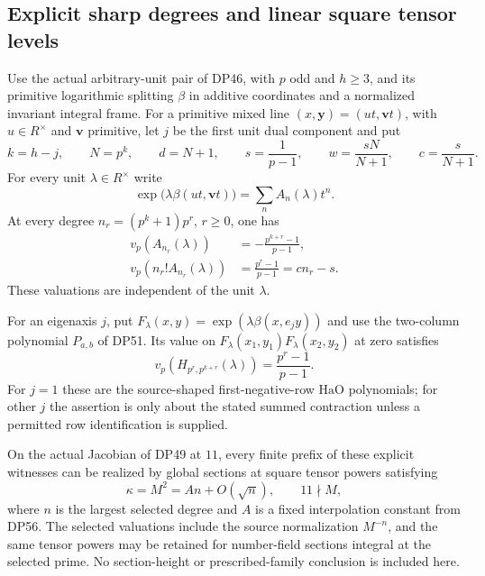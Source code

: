 \subsection{Explicit sharp degrees and linear square tensor levels}

\begin{theorem}\label{DP58}
Use the actual arbitrary-unit pair of DP46, with $p$ odd and $h\ge3$, and its primitive logarithmic splitting $\beta$ in additive coordinates and a normalized invariant integral frame.
For a primitive mixed line $(x,\mathbf y)=(ut,\mathbf vt)$, with $u\in R^\times$ and $\mathbf v$ primitive, let $j$ be the first unit dual component and put
\[
 k=h-j,\qquad N=p^k,\qquad d=N+1,\qquad
 s=\frac1{p-1},\qquad
 w=\frac{sN}{N+1},\qquad c=\frac{s}{N+1}.
\]
For every unit $\lambda\in R^\times$ write
\[
 \exp\bigl(\lambda\beta(ut,\mathbf vt)\bigr)
 =\sum_n A_n(\lambda)t^n.
\]
At every degree $n_r=(p^k+1)p^r$, $r\ge0$, one has
\begin{align}
 v_p(A_{n_r}(\lambda))
 &=-\frac{p^{k+r}-1}{p-1},\label{eq:explicitkernelcoefficient}\\
 v_p(n_r!A_{n_r}(\lambda))
 &=\frac{p^r-1}{p-1}=cn_r-s.\label{eq:explicitkerneljet}
\end{align}
These valuations are independent of the unit $\lambda$.

For an eigenaxis $j$, put
$F_\lambda(x,y)=\exp(\lambda\beta(x,e_jy))$ and use the two-column polynomial $P_{a,b}$ of DP51.
Its value on $F_\lambda(x_1,y_1)F_\lambda(x_2,y_2)$ at zero satisfies
\begin{equation}\label{eq:explicitharmonicjet}
 v_p(H_{p^r,p^{k+r}}(\lambda))
 =\frac{p^r-1}{p-1}.
\end{equation}
For $j=1$ these are the source-shaped first-negative-row $\mathrm{HaO}$ polynomials; for other $j$ the assertion is only about the stated summed contraction unless a permitted row identification is supplied.

On the actual Jacobian of DP49 at $11$, every finite prefix of these explicit witnesses can be realized by global sections at square tensor powers satisfying
\[
 \kappa=M^2=An+O(\sqrt n),\qquad 11\nmid M,
\]
where $n$ is the largest selected degree and $A$ is a fixed interpolation constant from DP56.
The selected valuations include the source normalization $M^{-n}$, and the same tensor powers may be retained for number-field sections integral at the selected prime.
No section-height or prescribed-family conclusion is included here.
\end{theorem}

